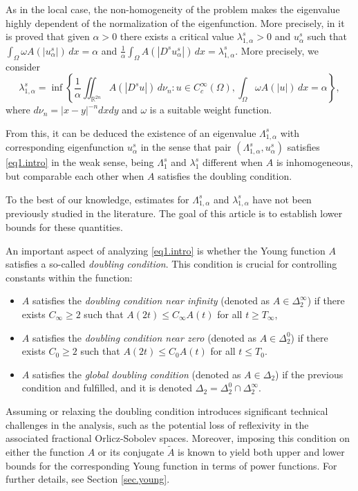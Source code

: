 \documentclass[12pt,reqno]{amsart}
\theoremstyle{definition}
\theoremstyle{remark}
\numberwithin{equation}{section}
\begin{document}
As in the local case, the non-homogeneity of the problem makes the eigenvalue highly dependent of the normalization of the eigenfunction. More precisely, in \cite{S20, SV22} it is  proved that given $\alpha>0$ there exists a critical value $\lambda_{1,\alpha}^s>0$ and $u_\alpha^s$ such that $\int_\Omega \omega A(|u^s_\alpha|)\,dx=\alpha$ and $\frac{1}{\alpha}\int_\Omega A(|D^s u^s_\alpha|)\,dx = \lambda^s_{1,\alpha}$. More precisely, we consider
\begin{equation} \label{minimi.intro}
\lambda_{1,\alpha}^s = \inf\left\{\frac{1}{\alpha}\iint_{\mathbb{R}^{2n}} A(|D^s  u|)\, d\nu_n \colon u\in C_c^\infty(\Omega), \int_\Omega  \omega A(|u|)\, dx = \alpha\right\},
\end{equation}
where $d\nu_n = |x-y|^{-n}dxdy$ and $\omega$ is a suitable weight function.

\noindent From this, it can be deduced the existence of an eigenvalue $\Lambda_{1,\alpha}^s$ with corresponding eigenfunction $u_\alpha^s$ in the sense that pair $(\Lambda^s_{1,\alpha}, u^s_\alpha)$ satisfies \eqref{eq1.intro} in the weak sense, being $\Lambda_1^s$ and $\lambda_1^s$ different  when $A$ is  inhomogeneous, but comparable each other when $A$ satisfies the doubling condition.



To the best of our knowledge, estimates for  $\Lambda_{1,\alpha}^s$ and $\lambda_{1,\alpha}^s$ have not been previously studied in the literature. The goal of this article is to establish lower bounds for these quantities.

An important aspect of analyzing \eqref{eq1.intro} is whether the Young function $A$ satisfies a so-called \emph{doubling condition}.  This condition is crucial for controlling constants within the function:
\begin{itemize}
\item[$\circ$] $A$ satisfies the \emph{doubling condition near infinity} (denoted as $A\in \Delta_2^\infty$) if there exists $C_\infty\geq 2$ such that $A(2t)\leq C_\infty A(t)$ for all $t\geq T_\infty$,
\item[$\circ$] $A$ satisfies the \emph{doubling condition near zero} (denoted as $A\in \Delta_2^0$) if there exists $C_0\geq 2$ such that $A(2t)\leq C_0 A(t)$ for all $t\leq  T_0$.
\item[$\circ$] $A$ satisfies the \emph{global doubling condition} (denoted as $A\in \Delta_2$) if the previous condition and fulfilled, and it is denoted $\Delta_2=\Delta_2^0\cap \Delta_2^\infty$.
\end{itemize}
Assuming or relaxing the doubling condition introduces significant technical challenges in the analysis, such as the potential loss of reflexivity in the associated fractional Orlicz-Sobolev spaces. Moreover, imposing this condition on either the function $A$ or its conjugate $\tilde A$ is known to yield both upper and lower bounds for the corresponding Young function in terms of power functions. For further details, see Section \ref{sec.young}.
\end{document}
